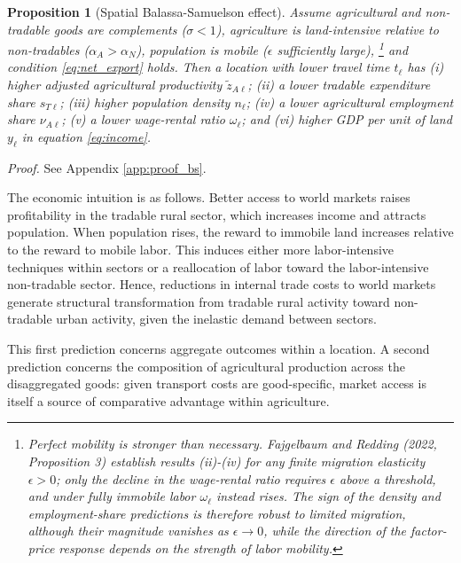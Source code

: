 \documentclass[11pt]{article}
\newtheorem{proposition}{Proposition}
\begin{document}
\begin{proposition}[Spatial Balassa-Samuelson effect]
\label{prop:bs}
Assume agricultural and non-tradable goods are complements ($\sigma<1$), agriculture is land-intensive relative to non-tradables ($\alpha_A>\alpha_N$), population is mobile ($\epsilon$ sufficiently large), \footnote{Perfect mobility is stronger than necessary. Fajgelbaum and Redding (2022, Proposition 3) establish results (ii)-(iv) for any finite migration elasticity $\epsilon>0$; only the decline in the wage-rental ratio requires $\epsilon$ above a threshold, and under fully immobile labor $\omega_\ell$ instead rises. The sign of the density and employment-share predictions is therefore robust to limited migration, although their magnitude vanishes as $\epsilon\to 0$, while the direction of the factor-price response depends on the strength of labor mobility.} and condition \eqref{eq:net_export} holds. Then a location with lower travel time $t_\ell$ has (i) higher adjusted agricultural productivity $\tilde z_{A\ell}$; (ii) a lower tradable expenditure share $s_{T\ell}$; (iii) higher population density $n_\ell$; (iv) a lower agricultural employment share $\nu_{A\ell}$; (v) a lower wage-rental ratio $\omega_\ell$; and (vi) higher GDP per unit of land $y_\ell$ in equation \eqref{eq:income}.
\end{proposition}

\noindent\emph{Proof.} See Appendix \ref{app:proof_bs}.\medskip

The economic intuition is as follows. Better access to world markets raises profitability in the tradable rural sector, which increases income and attracts population. When population rises, the reward to immobile land increases relative to the reward to mobile labor. This induces either more labor-intensive techniques within sectors or a reallocation of labor toward the labor-intensive non-tradable sector. Hence, reductions in internal trade costs to world markets generate structural transformation from tradable rural activity toward non-tradable urban activity, given the inelastic demand between sectors.

This first prediction concerns aggregate outcomes within a location. A second prediction concerns the composition of agricultural production across the disaggregated goods: given transport costs are good-specific, market access is itself a source of comparative advantage within agriculture.
\end{document}
